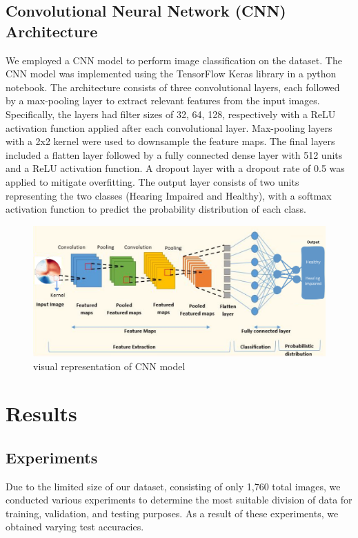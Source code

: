 \documentclass{article}
\begin{document}
\subsection{Convolutional Neural Network (CNN) Architecture}
We employed a CNN model to perform image classification on the dataset. The CNN model was implemented using the TensorFlow Keras library in a python notebook. The architecture consists of three convolutional layers, each followed by a max-pooling layer to extract relevant features from the input images. Specifically, the layers had filter sizes of 32, 64, 128, respectively with a ReLU activation function applied after each convolutional layer. Max-pooling layers with a 2x2 kernel were used to downsample the feature maps. The final layers included a flatten layer followed by a fully connected dense layer with 512 units and a ReLU activation function. A dropout layer with a dropout rate of 0.5 was applied to mitigate overfitting. The output layer consists of two units representing the two classes (Hearing Impaired and Healthy), with a softmax activation function to predict the probability distribution of each class.
\begin{figure}[H]
  \centering
  \includegraphics[width=1\textwidth]{Add a subheading.png} %
  \caption{visual representation of CNN model} %
\end{figure}

\section{Results}

\subsection{Experiments}
Due to the limited size of our dataset, consisting of only 1,760 total images, we conducted various experiments to determine the most suitable division of data for training, validation, and testing purposes. As a result of these experiments, we obtained varying test accuracies.
\end{document}
